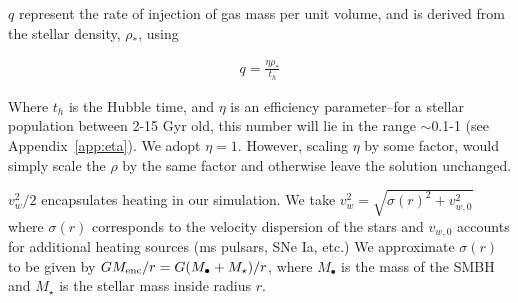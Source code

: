 \documentclass[usenatbib,fleqn]{mn2e}
\newcommand{\vw}{v_w}
\newcommand{\Menc}{M_{\rm enc}}
\newcommand{\Mstar}{M_{\star}}
\newcommand{\Mbh}[1][]{M_{\bullet#1}}
\begin{document}
$q$ represent the rate of injection of gas mass per unit volume, and
is derived from the stellar density, $\rho_*$, using

\begin{align}
q=\frac{\eta \rho_*}{t_h}
\end{align}

Where $t_h$ is the Hubble time, and $\eta$ is an efficiency parameter--for a stellar population between 2-15 Gyr old, this number will lie in the range $\sim$0.1-1 (see Appendix~\ref{app:eta}). We adopt $\eta=1$. However, scaling $\eta$ by some factor, would simply scale the $\rho$ by the same factor and otherwise leave the solution unchanged. 

$\vw^2/2$ encapsulates heating in our simulation. We take $\vw^2=\sqrt{\sigma(r)^2+v_{w,0}^2}$ where $\sigma(r)$ corresponds to the velocity dispersion of the stars and $v_{w,0}$ accounts for additional heating sources (ms pulsars, SNe Ia, etc.)  We approximate $\sigma(r)$ to be given by $G \Menc/r=G(\Mbh+\Mstar)/r$, where $\Mbh$ is the mass of the SMBH and $\Mstar$ is the stellar mass inside radius $r$. 

\end{document}
